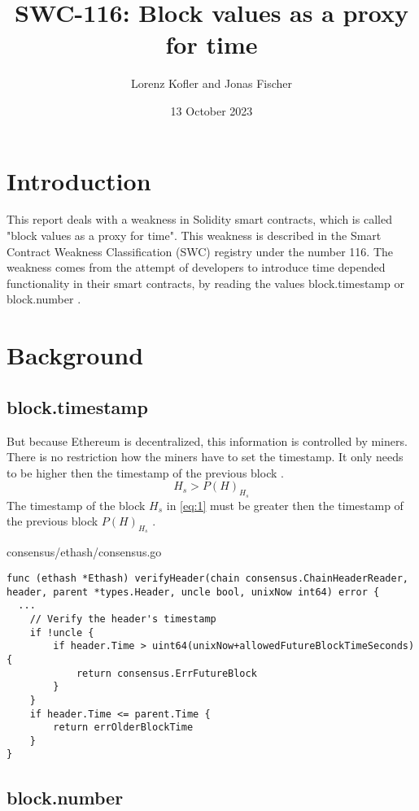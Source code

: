 \documentclass{article}
\title{SWC-116: Block values as a proxy for time}
\author{Lorenz Kofler and Jonas Fischer}
\date{13 October 2023}
\begin{document}
\maketitle
\tableofcontents
\newpage

\section{Introduction}
This report deals with a weakness in Solidity smart contracts, which is called "block values as a proxy for time".
This weakness is described in the Smart Contract Weakness Classification (SWC) registry under the number 116. \newline
The weakness comes from the attempt of developers to introduce time depended functionality in their smart contracts,
by reading the values block.timestamp or block.number \cite{swc116}. \newline

\section{Background}

\subsection{block.timestamp}
But because Ethereum is decentralized, this information is controlled by miners. There is no restriction how the miners have to set the timestamp.
It only needs to be higher then the timestamp of the previous block \cite{Conkas2021}.
\begin{equation} \label{eq:1}
H_s > P(H)_{H_s}
\end{equation}
The timestamp of the block $H_s$ in \ref{eq:1} must be greater then the timestamp of the previous block $P(H)_{H_s}$ \cite{ethyellowpaper2023}.

consensus/ethash/consensus.go
\begin{lstlisting}[laguage=go, caption="\cite{timestamp_code}"]
func (ethash *Ethash) verifyHeader(chain consensus.ChainHeaderReader, header, parent *types.Header, uncle bool, unixNow int64) error {
  ...
	// Verify the header's timestamp
	if !uncle {
		if header.Time > uint64(unixNow+allowedFutureBlockTimeSeconds) {
			return consensus.ErrFutureBlock
		}
	}
	if header.Time <= parent.Time {
		return errOlderBlockTime
	}
}
\end{lstlisting}
\cite{timestamp_code}

\subsection{block.number}
\end{document}
